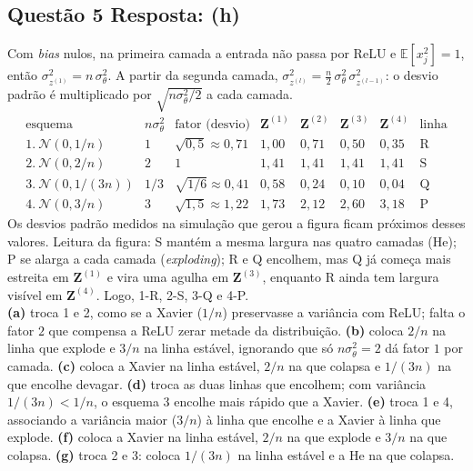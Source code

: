 \documentclass[11pt,a4paper]{article}
\begin{document}
\subsection*{Questão 5 \textemdash{} Resposta: (h)}
Com \textit{bias} nulos, na primeira camada a entrada não passa por ReLU e $\mathbb{E}[x_j^2] = 1$, então $\sigma^2_{z^{(1)}} = n\,\sigma_\theta^2$. A partir da segunda camada, $\sigma^2_{z^{(l)}} = \tfrac{n}{2}\,\sigma_\theta^2\,\sigma^2_{z^{(l-1)}}$: o desvio padrão é multiplicado por $\sqrt{n\sigma_\theta^2/2}$ a cada camada.
\[
\begin{array}{c|c|c|cccc|c}
\text{esquema} & n\sigma_\theta^2 & \text{fator (desvio)} & \mathbf{Z}^{(1)} & \mathbf{Z}^{(2)} & \mathbf{Z}^{(3)} & \mathbf{Z}^{(4)} & \text{linha}\\\hline
1.\ \mathcal{N}(0, 1/n) & 1 & \sqrt{0{,}5} \approx 0{,}71 & 1{,}00 & 0{,}71 & 0{,}50 & 0{,}35 & \text{R}\\
2.\ \mathcal{N}(0, 2/n) & 2 & 1 & 1{,}41 & 1{,}41 & 1{,}41 & 1{,}41 & \text{S}\\
3.\ \mathcal{N}(0, 1/(3n)) & 1/3 & \sqrt{1/6} \approx 0{,}41 & 0{,}58 & 0{,}24 & 0{,}10 & 0{,}04 & \text{Q}\\
4.\ \mathcal{N}(0, 3/n) & 3 & \sqrt{1{,}5} \approx 1{,}22 & 1{,}73 & 2{,}12 & 2{,}60 & 3{,}18 & \text{P}
\end{array}
\]
Os desvios padrão medidos na simulação que gerou a figura ficam próximos desses valores. Leitura da figura: S mantém a mesma largura nas quatro camadas (He); P se alarga a cada camada (\textit{exploding}); R e Q encolhem, mas Q já começa mais estreita em $\mathbf{Z}^{(1)}$ e vira uma agulha em $\mathbf{Z}^{(3)}$, enquanto R ainda tem largura visível em $\mathbf{Z}^{(4)}$. Logo, 1-R, 2-S, 3-Q e 4-P.\\
\textbf{(a)} troca 1 e 2, como se a Xavier ($1/n$) preservasse a variância com ReLU; falta o fator $2$ que compensa a ReLU zerar metade da distribuição.
\textbf{(b)} coloca $2/n$ na linha que explode e $3/n$ na linha estável, ignorando que só $n\sigma_\theta^2 = 2$ dá fator $1$ por camada.
\textbf{(c)} coloca a Xavier na linha estável, $2/n$ na que colapsa e $1/(3n)$ na que encolhe devagar.
\textbf{(d)} troca as duas linhas que encolhem; com variância $1/(3n) < 1/n$, o esquema 3 encolhe mais rápido que a Xavier.
\textbf{(e)} troca 1 e 4, associando a variância maior ($3/n$) à linha que encolhe e a Xavier à linha que explode.
\textbf{(f)} coloca a Xavier na linha estável, $2/n$ na que explode e $3/n$ na que colapsa.
\textbf{(g)} troca 2 e 3: coloca $1/(3n)$ na linha estável e a He na que colapsa.
\end{document}
